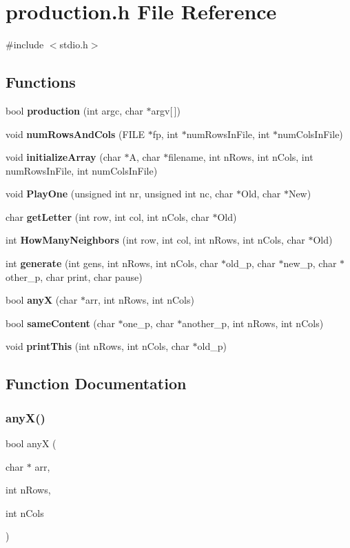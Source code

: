 \section{production.\+h File Reference}
\label{production_8h}
{\ttfamily \#include $<$stdio.\+h$>$}\newline
\subsection*{Functions}
\begin{DoxyCompactItemize}
\item 
bool \textbf{ production} (int argc, char $\ast$argv[$\,$])
\item 
void \textbf{ num\+Rows\+And\+Cols} (F\+I\+LE $\ast$fp, int $\ast$num\+Rows\+In\+File, int $\ast$num\+Cols\+In\+File)
\item 
void \textbf{ initialize\+Array} (char $\ast$A, char $\ast$filename, int n\+Rows, int n\+Cols, int num\+Rows\+In\+File, int num\+Cols\+In\+File)
\item 
void \textbf{ Play\+One} (unsigned int nr, unsigned int nc, char $\ast$Old, char $\ast$New)
\item 
char \textbf{ get\+Letter} (int row, int col, int n\+Cols, char $\ast$Old)
\item 
int \textbf{ How\+Many\+Neighbors} (int row, int col, int n\+Rows, int n\+Cols, char $\ast$Old)
\item 
int \textbf{ generate} (int gens, int n\+Rows, int n\+Cols, char $\ast$old\+\_\+p, char $\ast$new\+\_\+p, char $\ast$other\+\_\+p, char print, char pause)
\item 
bool \textbf{ anyX} (char $\ast$arr, int n\+Rows, int n\+Cols)
\item 
bool \textbf{ same\+Content} (char $\ast$one\+\_\+p, char $\ast$another\+\_\+p, int n\+Rows, int n\+Cols)
\item 
void \textbf{ print\+This} (int n\+Rows, int n\+Cols, char $\ast$old\+\_\+p)
\end{DoxyCompactItemize}


\subsection{Function Documentation}
\mbox{\label{production_8h_a85f4ceb7eddb00ab9989daf800a74d3f}} 
\subsubsection{any\+X()}
{\footnotesize\ttfamily bool anyX (\begin{DoxyParamCaption}\item[{char $\ast$}]{arr,  }\item[{int}]{n\+Rows,  }\item[{int}]{n\+Cols }\end{DoxyParamCaption})}


